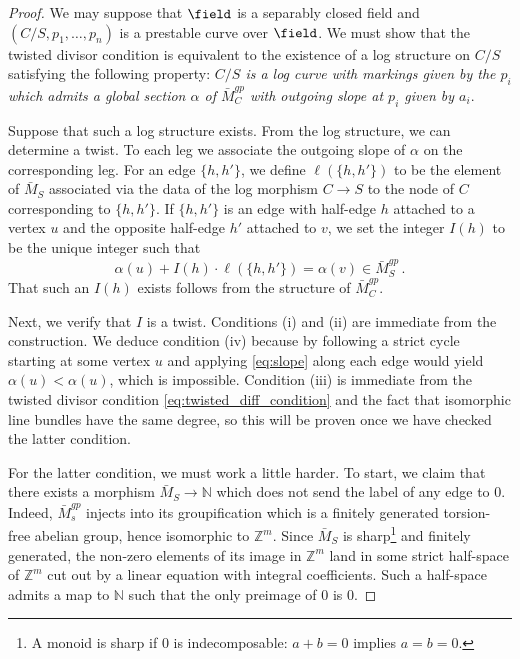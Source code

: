 \documentclass[a4paper,12pt]{article} %
\newcommand{\bb}[1]{{\mathbb{#1}}}
\theoremstyle{definition}
\theoremstyle{plain}%
\newcommand{\jocomment}[1]{}
\begin{document}
\begin{proof}
We may suppose that ${\field}$ is a separably closed field and $(C/S, p_1, \dots, p_n)$ is a prestable curve over ${\field}$. We must show
that the twisted divisor condition is equivalent to the existence of a log structure on $C/S$ satisfying the following property: {\em $C/S$  is a log curve with markings given by the $p_i$  which admits
a global section $\alpha$ of $\bar M_C^{gp}$ with outgoing slope at $p_i$ given by $a_i$}. 

Suppose that such a log structure exists. From the log structure,
we can determine a twist. To each leg we associate the outgoing 
slope of $\alpha$ on the corresponding leg. For an edge $\{ h, h'\}$,
we define $\ell(\{ h, h'\})$ to be the element of $\bar M_S$ associated via the data of the log morphism $C \to S$ to the node of $C$ corresponding to $\{h,h'\}$. If $\{ h, h'\}$ is an edge with half-edge $h$ attached to a vertex $u$ and the opposite half-edge $h'$ attached to $v$, we set the integer $I(h)$ to be the unique integer such that 
\begin{equation}\label{eq:slope}
\alpha(u) + I(h)\cdot \ell(\{h,h'\})  = \alpha(v) \in \bar M_S^{gp}\, .
\end{equation}
That such an $I(h)$ exists follows from the structure of $\bar M_C^{gp}$. 

Next, we verify that $I$ is a twist. Conditions (i) and (ii) are immediate from the construction.  We deduce condition (iv) because by following
a strict cycle starting at some vertex $u$ and applying \eqref{eq:slope} along each edge would yield 
$\alpha(u) < \alpha(u)$, 
which is impossible. Condition (iii) is immediate from the twisted divisor condition \eqref{eq:twisted_diff_condition} and the fact that isomorphic line bundles have the same degree, so this will be proven once we have checked the latter condition. 

For the latter condition,
we must work a little harder. To start,
we claim that there exists a morphism $\bar M_S \to \bb N$ which does not send the label of any edge to $0$. Indeed, $\bar M_s^{gp}$ injects into its groupification which is a finitely generated torsion-free abelian group, hence isomorphic to $\bb Z^m$. Since $\bar M_S$ is sharp\footnote{A monoid is sharp if $0$ is indecomposable: $a+b=0$ implies $a=b=0$.} and finitely generated, the non-zero elements of its image in $\bb Z^m$ land in some strict half-space of $\bb Z^m$ cut out by a linear equation with integral coefficients.  Such a half-space admits a map to $\bb N$ such that the only preimage of $0$ is $0$. 


\end{proof}
\end{document}
